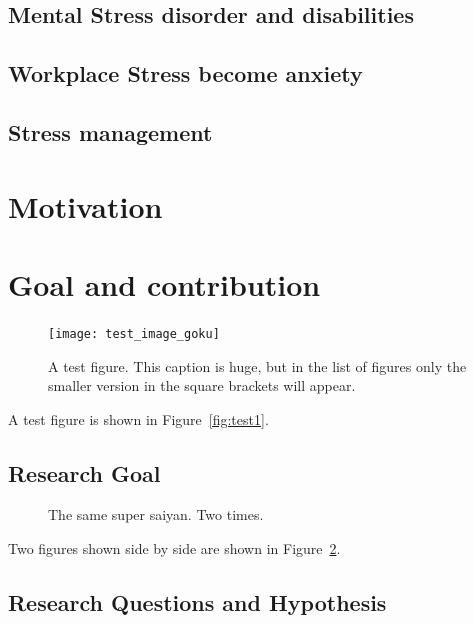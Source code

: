 \subsection{Mental Stress disorder and disabilities}
\subsection{Workplace Stress become anxiety}
\subsection{Stress management}
\section{Motivation}

\section{Goal and contribution} 
\blindtext

\begin{figure}[ht!] %
  \centering
  \texttt{[image: test\_image\_goku]}
  \caption[This is the short caption for List of Figures]{A test figure.  This caption is huge, but in the list of figures only the smaller version in the square brackets will appear.}
  \label{fig:test12}
\end{figure}

A test figure is shown in Figure~\ref{fig:test1}.

\subsection{Research Goal}

\begin{figure}[!ht]
    \centering
    \qquad
    \caption[Short Caption]{The same super saiyan. Two times.}        
    \label{fig:test2}
\end{figure}

Two figures shown side by side are shown in Figure~\ref{fig:test2}.

\subsection{Research Questions and Hypothesis}


